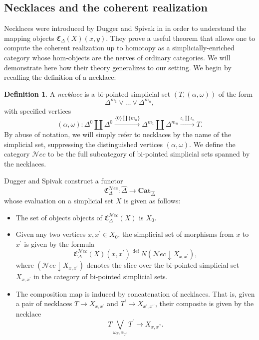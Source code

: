 \documentclass[a4paper]{article}
\numberwithin{equation}{subsection}
\theoremstyle{plain}   %
\theoremstyle{definition}
\newtheorem{defn}[equation]{Definition}
\theoremstyle{remark}
\theoremstyle{plain}
\newcommand{\Nec}{\ensuremath{{\mathcal{N}ec}}}
\newcommand{\Cat}{\ensuremath{\mathbf{Cat}}}
\newcommand{\overcat}[2]{{\left(#1\downarrow #2\right)}}
\newcommand{\psh}[1]{\ensuremath{\widehat{#1}}}
\newcommand{\defeq}{\overset{\mathrm{def}}=}
\begin{document}
\subsection{Necklaces and the coherent realization}
Necklaces were introduced by Dugger and Spivak in \cite{ds1} in order to understand the mapping objects \(\mathfrak{C}_\Delta(X)(x,y)\).  They prove a useful theorem that allows one to compute the coherent realization up to homotopy as a simplicially-enriched category whose hom-objects are the nerves of ordinary categories.  We will demonstrate here how their theory generalizes to our setting. We begin by recalling the definition of a necklace:

\begin{defn}
	A \emph{necklace} is a bi-pointed simplicial set \((T,(\alpha,\omega))\) of the form
	\[
		\Delta^{m_1} \vee \dots \vee \Delta^{m_n},
	\]
	with specified vertices 
	\[(\alpha,\omega):\Delta^0\coprod \Delta^0 \xrightarrow{\{0\}\coprod \{m_n\}} \Delta^{m_1} \coprod \Delta^{m_n}\xrightarrow{\iota_1\coprod \iota_n} T.\]
	By abuse of notation, we will simply refer to necklaces by the name of the simplicial set, suppressing the distinguished vertices \((\alpha,\omega)\).
	We define the category \(\Nec\) to be the full subcategory of bi-pointed simplicial sets spanned by the necklaces.
\end{defn}

Dugger and Spivak construct a functor
\[
	\mathfrak{C}^{\Nec}_\Delta: \psh{\Delta}\to \Cat_{\psh{\Delta}}
\]
whose evaluation on a simplicial set \(X\) is given as follows:
\begin{itemize}
	\item The set of objects objects of \(\mathfrak{C}^{\Nec}_\Delta(X)\) is \(X_0\).
	\item Given any two vertices \(x,x^\prime\in X_0\), the simplicial set of morphisms from \(x\) to \(x^\prime\) is given by the formula 
	\[
		\mathfrak{C}^{\Nec}_\Delta(X)(x,x^\prime)\defeq N\overcat{\Nec}{X_{x,x^\prime}},
	\]
	where \(\overcat{\Nec}{X_{x,x^\prime}}\) denotes the slice over the bi-pointed simplicial set \(X_{x,x^\prime}\) in the category of bi-pointed simplicial sets.  
	\item The composition map is induced by concatenation of necklaces.  That is, given a pair of necklaces \(T\to X_{x,x^\prime}\) and \(T^\prime\to X_{x^\prime,x^{\prime\prime}}\), their composite is given by the necklace 
	\[
		T \bigvee_{\omega_T,\alpha_{T^\prime}} T^\prime \to X_{x,x^{\prime\prime}}.
	\]
\end{itemize}
\end{document}
